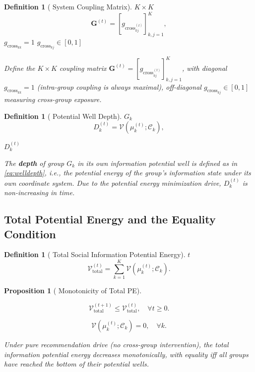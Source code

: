 \documentclass[11pt,a4paper]{article}
\newtheorem{proposition}[theorem]{Proposition}
\newtheorem{definition}[theorem]{Definition}
\theoremstyle{remark}
\newcommand{\GCoupling}{g_{\text{cross}}}
\newcommand{\CoordSys}{\mathcal{C}}
\newcommand{\InfoPE}{\mathcal{V}}
\begin{document}
\begin{definition}[ System Coupling Matrix]
 $K \times K$ 
\[
\mathbf{G}^{(t)} = [\GCoupling_{kj}^{(t)}]_{k,j=1}^K,
\]
 $\GCoupling_{kk} = 1$
 $\GCoupling_{kj} \in [0,1]$ 

Define the $K \times K$ coupling matrix $\mathbf{G}^{(t)} = [\GCoupling_{kj}^{(t)}]_{k,j=1}^K$,
with diagonal $\GCoupling_{kk} = 1$ (intra-group coupling is always maximal),
off-diagonal $\GCoupling_{kj} \in [0,1]$ measuring cross-group exposure.
\end{definition}

\begin{definition}[ Potential Well Depth]
 $G_k$ \textbf{}
\begin{equation}\label{eq:welldepth}
D_k^{(t)} = \InfoPE(\mu_k^{(t)}; \CoordSys_k),
\end{equation}

$D_k^{(t)}$ 

The \textbf{depth} of group $G_k$ in its own information potential well is defined as in
\eqref{eq:welldepth}, i.e., the potential energy of the group's information state under
its own coordinate system. Due to the potential energy minimization drive,
$D_k^{(t)}$ is non-increasing in time.
\end{definition}

\subsection{}

\subsection{Total Potential Energy and the Equality Condition}

\begin{definition}[ Total Social Information Potential Energy]
 $t$ 
\begin{equation}\label{eq:totalPE}
\InfoPE_{\text{total}}^{(t)} = \sum_{k=1}^K \InfoPE(\mu_k^{(t)}; \CoordSys_k).
\end{equation}
\end{definition}

\begin{proposition}[ Monotonicity of Total PE]\label{prop:monotone}

\[
\InfoPE_{\text{total}}^{(t+1)} \leq \InfoPE_{\text{total}}^{(t)}, \quad \forall t \geq 0.
\]

\[
\InfoPE(\mu_k^{(t)}; \CoordSys_k) = 0, \quad \forall k.
\]

Under pure recommendation drive (no cross-group intervention), the total information
potential energy decreases monotonically, with equality iff all groups have reached
the bottom of their potential wells.
\end{proposition}
\end{document}
